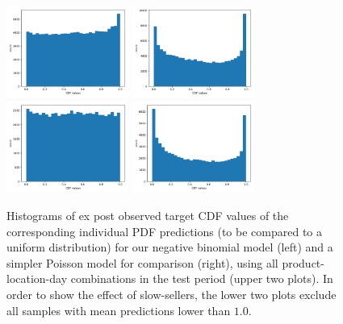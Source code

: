 \documentclass[BCOR=1mm, DIV=calc,10pt,
twoside=true,
twocolumn,
headings=normal]{scrartcl}
\begin{document}
\begin{figure}
\begin{center}
\includegraphics[width=4cm]{../figures/cdf_truth_nbinom}
\includegraphics[width=4cm]{../figures/cdf_truth_poisson}
\includegraphics[width=4cm]{../figures/cdf_truth_nbinom_larger1}
\includegraphics[width=4cm]{../figures/cdf_truth_poisson_larger1}
\caption{\label{fig:cdf_demand} Histograms of ex post observed target CDF values of the corresponding individual PDF predictions (to be compared to a uniform distribution) for our negative binomial model (left) and a simpler Poisson model for comparison (right), using all product-location-day combinations in the test period (upper two plots). In order to show the effect of slow-sellers, the lower two plots exclude all samples with mean predictions lower than $1.0$.}
\end{center}
\end{figure}
\end{document}

